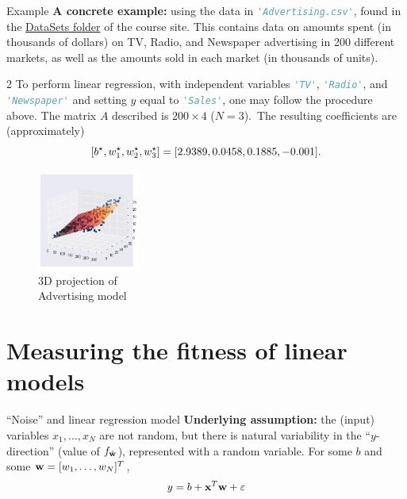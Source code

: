 \documentclass{beamer}
\theoremstyle{example}
\newcommand{\ct}[1]{\lstinline[language=Python,basicstyle=\ttfamily\footnotesize,stringstyle=\small\color{strings}]!#1!}
\begin{document}
\begin{frame}{Example}
    \textbf{A concrete example:} using the data in \ct{'Advertising.csv'}, found in the \href{https://github.com/cornwell/math371-S25/blob/main/DataSets/}{DataSets folder} of the course site. \newline 
    This contains data on amounts spent (in thousands of dollars) on TV, Radio, and Newspaper advertising in 200 different markets, as well as the amounts sold in each market (in thousands of units).
    
    \pause
    \begin{multicols}{2}
    To perform linear regression, with independent variables \ct{'TV'}, \ct{'Radio'}, and \ct{'Newspaper'} and setting $y$ equal to \ct{'Sales'}, one may follow the procedure above. The matrix $A$ described is $200\times 4$ ($N=3$).\pause\ The resulting coefficients are (approximately) \[{\scriptsize [b^\star, w_1^\star, w_2^\star, w_3^\star] = [2.9389, 0.0458, 0.1885, -0.001].}\]
    
    \begin{figure}[tight]
    \includegraphics[width=0.3\textwidth]{../../Images/multiregression-higherangle.png}
    \caption*{{\footnotesize 3D projection of\\ Advertising model}}
    \end{figure}
    \end{multicols}
\end{frame}

\section{Measuring the fitness of linear models}

\begin{frame}{``Noise'' and linear regression model}
    \textbf{Underlying assumption:} the (input) variables $x_1,\ldots,x_N$ are not random, but there is natural variability in the ``$y$-direction'' (value of $f_{\tilde{\bf w}}$), represented with a random variable. \newline 
    For some $b$ and some ${\bf w} = [w_1,\ldots, w_N]^T$, 
    \[y = b + {\bf x}^T{\bf w} + \varepsilon\]
\end{frame}
\end{document}
